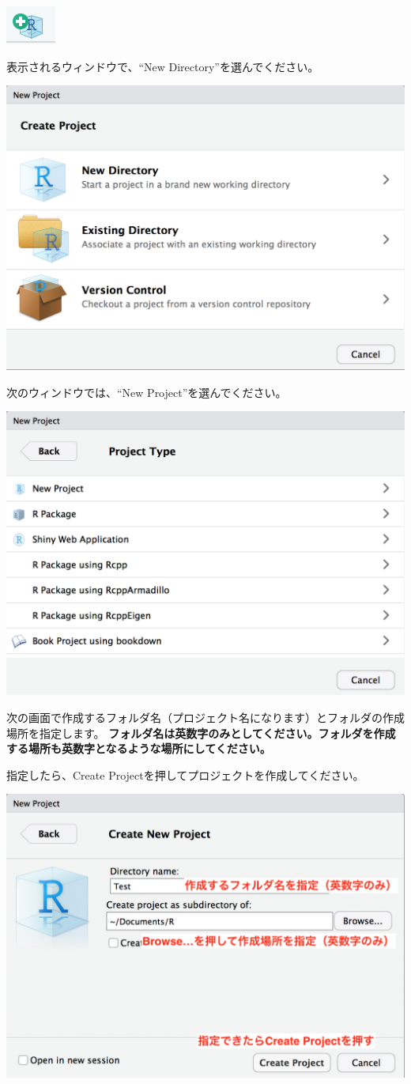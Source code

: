 \documentclass[
]{book}
\begin{document}
\begin{center}\includegraphics[width=0.05\linewidth]{image/project1} \end{center}

表示されるウィンドウで、``New Directory''を選んでください。

\begin{center}\includegraphics[width=0.5\linewidth]{image/project2} \end{center}

次のウィンドウでは、``New Project''を選んでください。

\begin{center}\includegraphics[width=0.5\linewidth]{image/project3} \end{center}

次の画面で作成するフォルダ名（プロジェクト名になります）とフォルダの作成場所を指定します。
\textbf{フォルダ名は英数字のみとしてください。フォルダを作成する場所も英数字となるような場所にしてください。}

指定したら、Create Projectを押してプロジェクトを作成してください。

\begin{center}\includegraphics[width=0.5\linewidth]{image/project4} \end{center}
\end{document}
